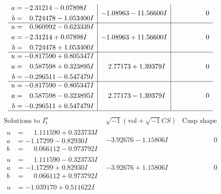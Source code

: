 \documentclass[1p]{elsarticle_modified}
\theoremstyle{definition}
\newcommand{\I}{\sqrt{-1}}
\begin{document}
$$\begin{array}{c|c|c}
\begin{aligned}
a &= -2.31214 - 0.07898 I \\
b &= \phantom{-}0.724478 - 1.053400 I\end{aligned}
 & -1.08963 - 11.56600 I & \phantom{-0.000000 } 0 \\ \hline\begin{aligned}
u &= \phantom{-}0.960992 - 0.623339 I \\
a &= -2.31214 + 0.07898 I \\
b &= \phantom{-}0.724478 + 1.053400 I\end{aligned}
 & -1.08963 + 11.56600 I & \phantom{-0.000000 } 0 \\ \hline\begin{aligned}
u &= -0.817590 + 0.805347 I \\
a &= \phantom{-}0.587598 + 0.323895 I \\
b &= -0.296511 - 0.547479 I\end{aligned}
 & \phantom{-}2.77173 + 1.39379 I & \phantom{-0.000000 } 0 \\ \hline\begin{aligned}
u &= -0.817590 - 0.805347 I \\
a &= \phantom{-}0.587598 - 0.323895 I \\
b &= -0.296511 + 0.547479 I\end{aligned}
 & \phantom{-}2.77173 - 1.39379 I & \phantom{-0.000000 } 0\\
 \hline 
 \end{array}$$\newpage$$\begin{array}{c|c|c}  
\text{Solutions to }I^u_{1}& \I (\text{vol} + \sqrt{-1}CS) & \text{Cusp shape}\\
 \hline 
\begin{aligned}
u &= \phantom{-}1.111590 + 0.323733 I \\
a &= -1.17299 - 0.82930 I \\
b &= \phantom{-}0.066112 - 0.973792 I\end{aligned}
 & -3.92676 - 1.15806 I & \phantom{-0.000000 } 0 \\ \hline\begin{aligned}
u &= \phantom{-}1.111590 - 0.323733 I \\
a &= -1.17299 + 0.82930 I \\
b &= \phantom{-}0.066112 + 0.973792 I\end{aligned}
 & -3.92676 + 1.15806 I & \phantom{-0.000000 } 0 \\ \hline\begin{aligned}
u &= -1.039170 + 0.511622 I \\

\end{aligned}
\end{array}$$
\end{document}
